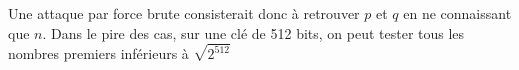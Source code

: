 \begin{itemize}
Une attaque par force brute consisterait donc à retrouver $p$ et $q$ en ne connaissant que $n$. Dans le pire des cas, sur une clé de 512 bits, on peut tester tous les nombres premiers inférieurs à $\sqrt{2^{512}}$\\


\end{itemize}
